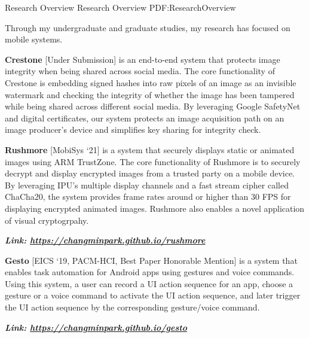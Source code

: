 \documentclass[letterpaper,MMMyyyy,nonstopmode]{simpleresumecv}
\begin{document}
\begin{Body}
\vspace{-0.7ex}
\Section
{Research Overview}
{Research Overview}
{PDF:ResearchOverview}

\Entry
Through my undergraduate and graduate studies, my research has focused on mobile systems.

\Gap
\BulletItem
\textbf{Crestone} [Under Submission] is an end-to-end system that protects image integrity 
when being shared across social media. The core functionality of Crestone is embedding signed
hashes into raw pixels of an image as an invisible watermark and checking the integrity of 
whether the image has been tampered while being shared across different social media. 
By leveraging Google SafetyNet and digital certificates, our system protects an image 
acquisition path on an image producer's device and simplifies key sharing for integrity check. 


\vspace{0.5ex}

\Gap
\BulletItem
\textbf{Rushmore} [MobiSys `21] is a system that securely displays static or animated images 
using ARM TrustZone. The core functionality of Rushmore is to securely decrypt and display encrypted 
images from a trusted party on a mobile device. By leveraging IPU's multiple display channels and
a fast stream cipher called ChaCha20, the system provides frame rates around or higher than 30 FPS 
for displaying encrypted animated images. Rushmore also enables a novel application of visual 
cryptogrpahy.

\hspace{2ex}
\textbf{\textit{Link: \href{https://changminpark.github.io/rushmore}
{https://changminpark.github.io/rushmore}}}
\hfill

\vspace{0.5ex}
\Gap
\BulletItem
\textbf{Gesto} [EICS `19, PACM-HCI, Best Paper Honorable Mention] is a system that enables task 
automation for Android apps using gestures 
and voice commands. Using this system, a user can record a UI action sequence for an app, 
choose a gesture or a voice command to activate the UI action sequence, and later trigger 
the UI action sequence by the corresponding gesture/voice command.

\hspace{2ex}
\textbf{\textit{Link: \href{https://changminpark.github.io/gesto}
{https://changminpark.github.io/gesto}}}
\hfill


\end{Body}
\end{document}
